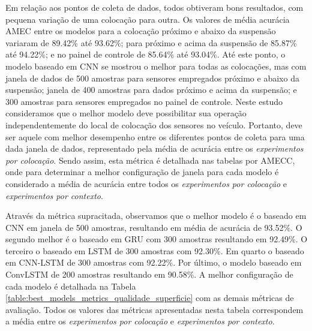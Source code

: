 Em relação aos pontos de coleta de dados, todos obtiveram bons resultados, com pequena variação de uma colocação para outra. Os valores de média acurácia AMEC entre os modelos para a colocação próximo e abaixo da suspensão variaram de 89.42\% até 93.62\%; para próximo e acima da suspensão de 85.87\% até 94.22\%; e no painel de controle de 85.64\% até 93.04\%. Até este ponto, o modelo baseado em CNN se mostrou o melhor para todas as colocações, mas com janela de dados de 500 amostras para sensores empregados próximo e abaixo da suspensão; janela de 400 amostras para dados próximo e acima da suspensão; e 300 amostras para sensores empregados no painel de controle. Neste estudo consideramos que o melhor modelo deve possibilitar sua operação independentemente do local de colocação dos sensores no veículo. Portanto, deve ser aquele com melhor desempenho entre os diferentes pontos de coleta para uma dada janela de dados, representado pela média de acurácia entre os \emph{experimentos por colocação}. Sendo assim, esta métrica é detalhada nas tabelas por AMECC, onde para determinar a melhor configuração de janela para cada modelo é considerado a média de acurácia entre todos os \emph{experimentos por colocação} e \emph{experimentos por contexto}.

Através da métrica supracitada, observamos que o melhor modelo é o baseado em CNN em janela de 500 amostras, resultando em média de acurácia de 93.52\%. O segundo melhor é o baseado em GRU com 300 amostras resultando em 92.49\%. O terceiro o baseado em LSTM de 300 amostras com 92.30\%. Em quarto o baseado em CNN-LSTM de 300 amostras com 92.22\%. Por último, o modelo baseado em ConvLSTM de 200 amostras resultando em 90.58\%. A melhor configuração de cada modelo é detalhada na Tabela \ref{table:best_models_metrics_qualidade_superficie} com as demais métricas de avaliação. Todos os valores das métricas apresentadas nesta tabela correspondem a média entre os \emph{experimentos por colocação} e \emph{experimentos por contexto}.

